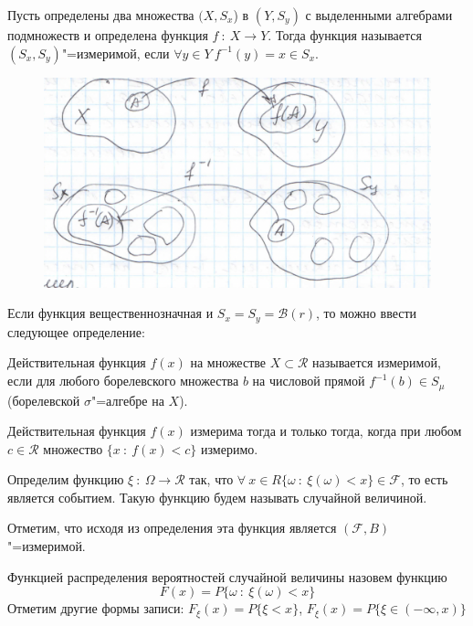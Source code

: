 \begin{definition}
Пусть определены два множества $(X, S_x$) в 
$(Y, S_y)$ с выделенными алгебрами подмножеств и
определена функция $f ~:~ X \rightarrow Y$. Тогда
функция называется $(S_x, S_y)$"=измеримой,
если $\forall y \in Y ~ f^{-1}(y) = x \in S_x$.
\end{definition}
\begin{figure}[H]
    \centering
    \includegraphics[scale=0.5]{images/izmer.png}
\end{figure}
Если функция вещественнозначная и $S_x = S_y = \mathcal{B}(r)$, то можно
ввести следующее определение:
\begin{definition}
    Действительная функция $f(x)$ на множестве
    $X \subset \mathcal{R}$ называется измеримой, если для любого
    борелевского множества $b$ на числовой прямой $f^{-1}(b) \in S_\mu$(борелевской $\sigma$"=алгебре на $X$).
\end{definition}

\begin{theorem}
    Действительная функция $f(x)$ измерима тогда и только тогда, когда
    при любом $c \in \mathcal{R}$ множество $\{x ~:~ f(x) < c\}$ измеримо.
\end{theorem}


\begin{definition}
    Определим функцию $\xi ~:~ \Omega \rightarrow \mathcal{R}$ так, что
    $\forall~ x \in R \{\omega ~:~ \xi(\omega) < x\} \in \mathcal{F}$, то есть
    является событием. Такую функцию будем называть случайной величиной.
\end{definition}
Отметим, что исходя из определения эта функция является $(\mathcal{F}, B)$"=измеримой.

\begin{definition}
    Функцией распределения вероятностей случайной величины
    назовем функцию 
    \begin{equation*}
        F(x) = P\{\omega ~:~ \xi(\omega) < x\}    
    \end{equation*}
    Отметим другие формы записи: $F_\xi(x) = P\{\xi < x\}$, $F_\xi(x) = P\{\xi \in (-\infty, x)\}$
\end{definition}

